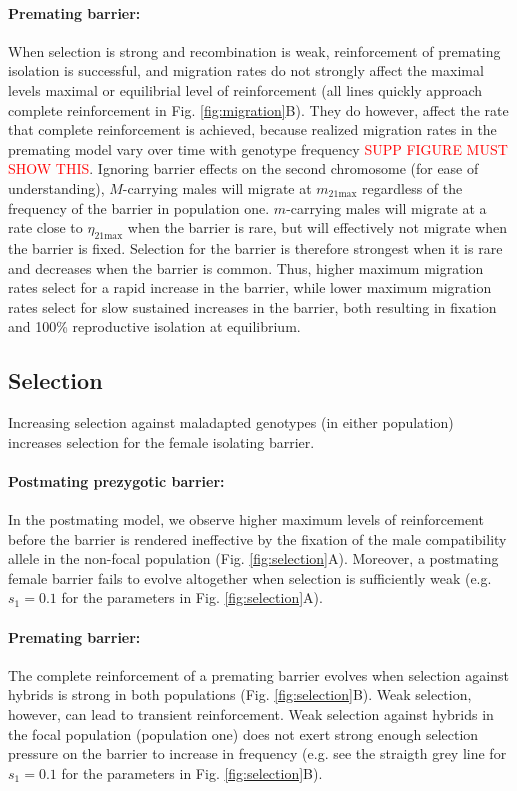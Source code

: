 \documentclass[11pt]{article}
\begin{document}
\paragraph{Premating barrier:} When selection is strong and recombination is weak, reinforcement of premating isolation is successful, and migration rates do not strongly affect the maximal levels maximal or equilibrial level of reinforcement (all lines quickly approach complete reinforcement in Fig. \ref{fig:migration}B).     
They do however, affect the rate that complete reinforcement is achieved, because realized migration rates in the premating model vary over time with genotype frequency \textcolor{red}{SUPP FIGURE MUST SHOW THIS}.  
Ignoring barrier effects on the second chromosome (for ease of understanding), $M$-carrying males will migrate at $m_{21\text{max}}$ regardless of the frequency of the barrier in population one.
$m$-carrying males will migrate at a rate close to $\eta_{21\text{max}}$ when the barrier is rare, but will effectively not migrate when the barrier is fixed. 
Selection for the barrier is therefore strongest when it is rare and decreases when the barrier is common. 
Thus, higher maximum migration rates select for a rapid increase in the barrier, while lower maximum migration rates select for slow sustained increases in the barrier, both resulting in fixation and 100\% reproductive isolation at equilibrium.   

\subsection*{Selection}\label{section:selection}
Increasing selection against maladapted genotypes (in either population) increases selection for the female isolating barrier. 

\paragraph{Postmating prezygotic barrier:} In the postmating model, we observe higher maximum levels of reinforcement before the barrier is rendered ineffective by the fixation of the male compatibility allele in the non-focal population (Fig. \ref{fig:selection}A).  
Moreover, a postmating female barrier fails to evolve altogether when selection is sufficiently weak (e.g. $s_1 = 0.1$ for the parameters in Fig. \ref{fig:selection}A).

\paragraph{Premating barrier:} The complete reinforcement of a premating barrier evolves when selection against hybrids is strong in both populations (Fig. \ref{fig:selection}B).  
Weak selection, however, can lead to transient reinforcement.  
Weak selection against hybrids in the focal population (population one) does not exert strong enough selection pressure on the barrier to increase in frequency (e.g. see the straigth grey line for $s_1 = 0.1$ for the parameters in Fig. \ref{fig:selection}B). 
\end{document}
